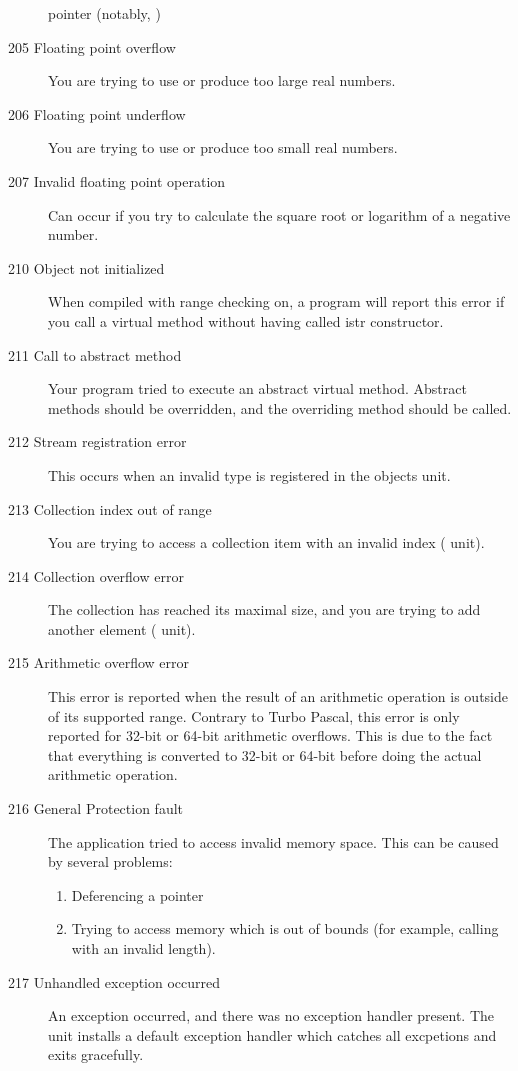 \begin{description}
pointer (notably, )
\item [205  Floating point overflow]
You are trying to use or produce too large real numbers.
\item [206  Floating point underflow]
You are trying to use or produce too small real numbers.
\item [207  Invalid floating point operation]
Can occur if you try to calculate the square root or logarithm of a negative
number.
\item [210  Object not initialized]
When compiled with range checking on, a program will report this error if
you call a virtual method without having called istr constructor.
\item [211  Call to abstract method]
Your program tried to execute an abstract virtual method. Abstract methods
should be overridden, and the overriding method should be called.
\item [212  Stream registration error]
This occurs when an invalid type is registered in the objects unit.
\item [213  Collection index out of range]
You are trying to access a collection item with an invalid index
( unit).
\item [214  Collection overflow error]
The collection has reached its maximal size, and you are trying to add
another element ( unit).
\item[215 Arithmetic overflow error]
This error is reported when the result of an arithmetic operation
is outside of its supported range. Contrary to Turbo Pascal, this error
is only reported for 32-bit or 64-bit arithmetic overflows. This is due
to the fact that everything is converted to 32-bit or 64-bit before
doing the actual arithmetic operation.
\item [216  General Protection fault]
The application tried to access invalid memory space. This can
be caused by several problems:
\begin{enumerate}
 \item Deferencing a  pointer
 \item Trying to access memory which is out of bounds
       (for example, calling  with an invalid length).
\end{enumerate}

\item [217 Unhandled exception occurred]
An exception occurred, and there was no exception handler present.
The  unit installs a default exception handler which catches
all excpetions and exits gracefully.


\end{description}

